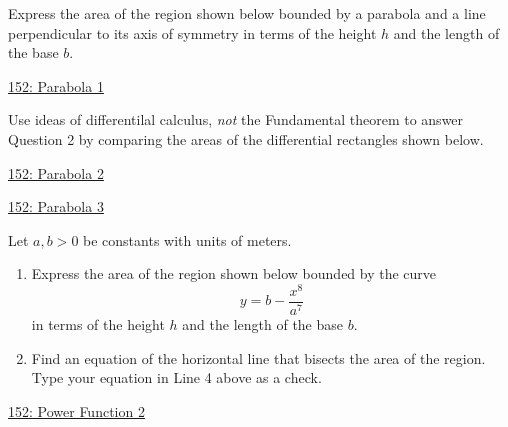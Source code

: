 \documentclass{ximera}
\begin{document}
\begin{question} \label{QOLDFKRerbttp}
Express the area of the region shown below bounded by a parabola and a line perpendicular to its axis of symmetry in terms of the height $h$ and the length of the base $b$.

\begin{onlineOnly}
    \begin{center}
\end{center}
\end{onlineOnly}

\href{https://www.desmos.com/calculator/kkdfpr66rt}{152: Parabola 1}

\end{question}


\begin{question}  \label{Q9erkmbzxee}
Use ideas of differentilal calculus, \emph{not} the Fundamental theorem to answer Question 2 by comparing the areas of the differential rectangles shown below.

\begin{onlineOnly}
    \begin{center}
\end{center}
\end{onlineOnly}

\href{https://www.desmos.com/calculator/pvskgbpnew}{152: Parabola 2}

\begin{onlineOnly}
    \begin{center}
\end{center}
\end{onlineOnly}

\href{https://www.desmos.com/calculator/0w37bixe79}{152: Parabola 3}

\end{question}



\begin{question} \label{QOLDefeefKRerbttp}
Let $a,b>0$ be constants with units of meters.

\begin{enumerate}
\item Express the area of the region shown below bounded by the curve
\[
   y=b - \frac{x^8}{a^7}
\]
in terms of the height $h$ and the length of the base $b$.

\item Find an equation of the horizontal line that bisects the area of the region. Type your equation in Line 4 above as a check. 

\end{enumerate}

\begin{onlineOnly}
    \begin{center}
\end{center}
\end{onlineOnly}

\href{https://www.desmos.com/calculator/h5vv8j3v0n}{152: Power Function 2}

\end{question}
\end{document}
